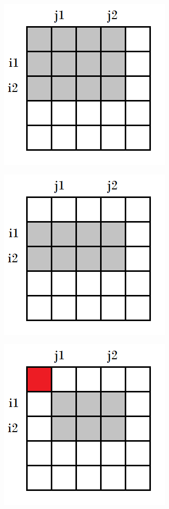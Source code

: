 \documentclass[12pt, a4paper]{article}
\begin{document}
	\begin{center}
		\begin{multicols}{4}
        	\begin{figure}[H]
        		\centering
				\includegraphics[scale=0.4]{Estructuras_de_datos/imagenes/tablas_aditivas/img1}
				\caption{}
				\label{estructuras:tablas_aditivas:img1}
			\end{figure}
			\columnbreak
			\begin{figure}[H]
				\centering
				\includegraphics[scale=0.4]{Estructuras_de_datos/imagenes/tablas_aditivas/img2}
				\caption{}
				\label{estructuras:tablas_aditivas:img2}
			\end{figure}
			\columnbreak
			\begin{figure}[H]
				\centering
				\includegraphics[scale=0.4]{Estructuras_de_datos/imagenes/tablas_aditivas/img3}

\end{figure}
\end{multicols}
\end{center}
\end{document}
